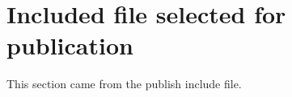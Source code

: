 \section*{Included file selected for publication}\noindent This section came from the publish include file.
